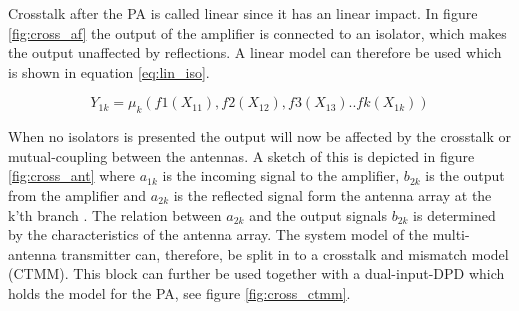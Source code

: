 Crosstalk after the PA is called linear since it has an linear impact. In figure \ref{fig:cross_af} the output of the amplifier is connected to an isolator, which makes the output unaffected by reflections. A linear model can therefore be used which is shown in equation \ref{eq:lin_iso}. 

\begin{equation} \label{eq:lin_iso}
Y_{1k} = \mu_k(f1(X_{11}),f2(X_{12}),f3(X_{13})..fk(X_{1k}))
\end{equation}     

When no isolators is presented the output will now be affected by the crosstalk or mutual-coupling between the antennas. A sketch of this is depicted in figure \ref{fig:cross_ant} where $a_{1k}$ is the incoming signal to the amplifier, $b_{2k}$ is the output from the amplifier and $a_{2k}$ is the reflected signal form the antenna array at the k'th branch \citep{Hausmair2017}. The relation between $a_{2k}$
and the output signals $b_{2k}$ is determined by the characteristics
of the antenna array. The system model of the multi-antenna
transmitter can, therefore, be split in to a crosstalk and
mismatch model (CTMM). This block can further be used together with a dual-input-DPD which holds the model for the PA, see figure \ref{fig:cross_ctmm}. 


